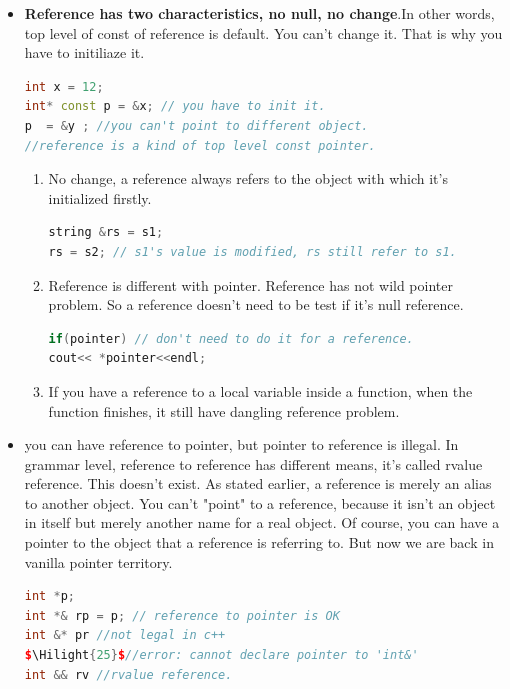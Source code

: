 \documentclass[a4paper,11pt,twoside]{book}
\newcommand{\Hilight}[1]{\makebox[0pt][l]{\color{yellow}\rule[-3pt]{#1em}{11pt}}}
\newcommand{\Hilight}[1]{}
\begin{document}
\begin{itemize}
\item \textbf{Reference has two characteristics, no null, no change}.In other words, top level of const of reference is default. You can't change it. That is why you have to initiliaze it.
\begin{lstlisting}[frame=single, language=c++]
int x = 12;
int* const p = &x; // you have to init it.
p  = &y ; //you can't point to different object.
//reference is a kind of top level const pointer.
\end{lstlisting}

\begin{enumerate}
\item No change, a reference always refers to the object with which it's initialized firstly.
\begin{lstlisting}[frame=single, language=c++]
string &rs = s1;
rs = s2; // s1's value is modified, rs still refer to s1.
\end{lstlisting}

\item Reference is different with pointer. Reference has not wild pointer problem. So a reference doesn't need to be test if it's null reference.
\begin{lstlisting}[frame=single, language=c++]
if(pointer) // don't need to do it for a reference.
cout<< *pointer<<endl;
\end{lstlisting}

\item If you have a reference to a local variable inside a function, when the function finishes, it still have dangling reference problem. 
\end{enumerate}

\item you can have reference to pointer, but pointer to reference is illegal. In grammar level, reference to reference has different means, it's called rvalue reference. This doesn't exist. As stated earlier, a reference is merely an alias to another object. You can't "point" to a reference, because it isn't an object in itself but merely another name for a real object. Of course, you can have a pointer to the object that a reference is referring to. But now we are back in vanilla pointer territory.
\begin{lstlisting}[frame=single, language=c++]
int *p;
int *& rp = p; // reference to pointer is OK
int &* pr //not legal in c++
$\Hilight{25}$//error: cannot declare pointer to 'int&'
int && rv //rvalue reference.
\end{lstlisting}


\end{itemize}
\end{document}
